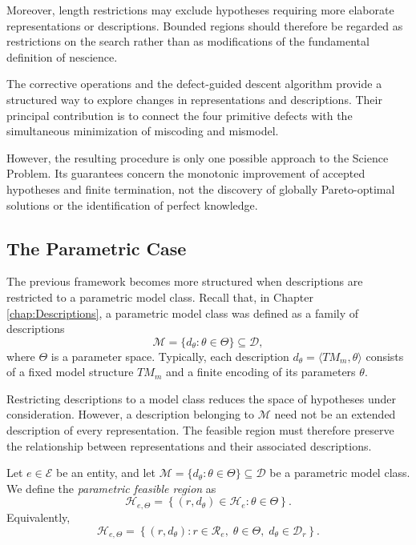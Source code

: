 Moreover, length restrictions may exclude
hypotheses requiring more elaborate representations
or descriptions. Bounded regions should therefore
be regarded as restrictions on the search rather
than as modifications of the fundamental
definition of nescience.

The corrective operations and the defect-guided
descent algorithm provide a structured way to
explore changes in representations and descriptions.
Their principal contribution is to connect the
four primitive defects with the simultaneous
minimization of miscoding and mismodel.

However, the resulting procedure is only one
possible approach to the Science Problem.
Its guarantees concern the monotonic improvement
of accepted hypotheses and finite termination,
not the discovery of globally Pareto-optimal
solutions or the identification of perfect knowledge.


\subsection*{The Parametric Case}
\label{sec:nescience_parametric_case}

The previous framework becomes more structured when descriptions are restricted to a parametric model class. Recall that, in Chapter \ref{chap:Descriptions}, a parametric model class was defined as a family of descriptions
\[
\mathcal M=\{d_\theta:\theta\in\Theta\}\subseteq\mathcal D,
\]
where $\Theta$ is a parameter space. Typically, each description $d_\theta=\langle TM_m,\theta\rangle$ consists of a fixed model structure $TM_m$ and a finite encoding of its parameters $\theta$.

Restricting descriptions to a model class reduces the space of hypotheses under consideration. However, a description belonging to $\mathcal M$ need not be an extended description of every representation. The feasible region must therefore preserve the relationship between representations and their associated descriptions.

\begin{definition}
Let $e\in\mathcal E$ be an entity, and let $\mathcal M=\{d_\theta:\theta\in\Theta\}\subseteq\mathcal D$
be a parametric model class. We define the \emph{parametric feasible region}  as
\[
\mathcal H_{e,\Theta} = \left\{(r,d_\theta)\in\mathcal H_e: \theta\in\Theta\right\}.
\]
Equivalently,
\[
\mathcal H_{e,\Theta} = \left\{(r,d_\theta): r\in\mathcal R_e,\;
    \theta\in\Theta,\; d_\theta\in\mathcal D_r \right\}.
\]
\end{definition}

